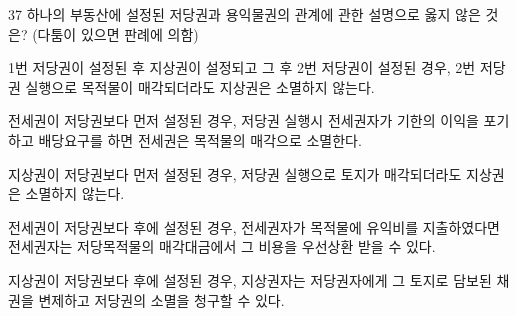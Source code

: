 \begin{question}{37}
하나의 부동산에 설정된 저당권과 용익물권의 관계에 관한 설명으로 옳지 않은 것은? (다툼이 있으면 판례에 의함)
\begin{choices}
  \item 1번 저당권이 설정된 후 지상권이 설정되고 그 후 2번 저당권이 설정된 경우, 2번 저당권 실행으로 목적물이 매각되더라도 지상권은 소멸하지 않는다.
  \item 전세권이 저당권보다 먼저 설정된 경우, 저당권 실행시 전세권자가 기한의 이익을 포기하고 배당요구를 하면 전세권은 목적물의 매각으로 소멸한다.
  \item 지상권이 저당권보다 먼저 설정된 경우, 저당권 실행으로 토지가 매각되더라도 지상권은 소멸하지 않는다.
  \item 전세권이 저당권보다 후에 설정된 경우, 전세권자가 목적물에 유익비를 지출하였다면 전세권자는 저당목적물의 매각대금에서 그 비용을 우선상환 받을 수 있다.
  \item 지상권이 저당권보다 후에 설정된 경우, 지상권자는 저당권자에게 그 토지로 담보된 채권을 변제하고 저당권의 소멸을 청구할 수 있다.
\end{choices}
\end{question}
